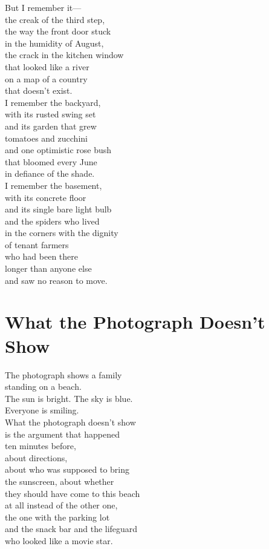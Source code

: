 \documentclass[
    language=english,
    doctype=poetry-collection,
    institution=none,
]{../../omnilatex}
\begin{document}
But I remember it---\\
the creak of the third step,\\
the way the front door stuck\\
in the humidity of August,\\
the crack in the kitchen window\\
that looked like a river\\
on a map of a country\\
that doesn't exist.\\

I remember the backyard,\\
with its rusted swing set\\
and its garden that grew\\
tomatoes and zucchini\\
and one optimistic rose bush\\
that bloomed every June\\
in defiance of the shade.\\

I remember the basement,\\
with its concrete floor\\
and its single bare light bulb\\
and the spiders who lived\\
in the corners with the dignity\\
of tenant farmers\\
who had been there\\
longer than anyone else\\
and saw no reason to move.

\section*{What the Photograph Doesn't Show}

The photograph shows a family\\
standing on a beach.\\
The sun is bright. The sky is blue.\\
Everyone is smiling.\\

What the photograph doesn't show\\
is the argument that happened\\
ten minutes before,\\
about directions,\\
about who was supposed to bring\\
the sunscreen, about whether\\
they should have come to this beach\\
at all instead of the other one,\\
the one with the parking lot\\
and the snack bar and the lifeguard\\
who looked like a movie star.\\
\end{document}
